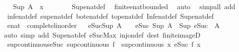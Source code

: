 \begin{isabellebody}
\ \isamarkupfalse%
\ {\isachardoublequoteopen}Sup\ A\ {\isasymle}\ x{\isachardoublequoteclose}\isanewline
\ \ \ \ \ \ \isamarkupfalse%
\ Sup{\isacharunderscore}enat{\isacharunderscore}def\ \isamarkupfalse%
\ finite{\isacharunderscore}enat{\isacharunderscore}bounded\ \isamarkupfalse%
\ auto\ \isacommand{{\isacharbraceright}}\isamarkupfalse%
\isanewline
{}\isamarkupfalse%
\ {\isacharparenleft}simp{\isacharunderscore}all\ add{\isacharcolon}\isanewline
\ inf{\isacharunderscore}enat{\isacharunderscore}def\ sup{\isacharunderscore}enat{\isacharunderscore}def\ bot{\isacharunderscore}enat{\isacharunderscore}def\ top{\isacharunderscore}enat{\isacharunderscore}def\ Inf{\isacharunderscore}enat{\isacharunderscore}def\ Sup{\isacharunderscore}enat{\isacharunderscore}def{\isacharparenright}%
\endisatagproof
{\isafoldproof}%
%
\isadelimproof
\isanewline
%
\endisadelimproof
{}\isamarkupfalse%
\isanewline
\isanewline
{}\isamarkupfalse%
\ enat\ {\isacharcolon}{\isacharcolon}\ complete{\isacharunderscore}linorder%
\isadelimproof
\ %
\endisadelimproof
%
\isatagproof
\isacommand{{\isachardot}{\isachardot}}\isamarkupfalse%
%
\endisatagproof
{\isafoldproof}%
%
\isadelimproof
%
\endisadelimproof
\isanewline
\isanewline
{}\isamarkupfalse%
\ eSuc{\isacharunderscore}Sup{\isacharcolon}\ {\isachardoublequoteopen}A\ {\isasymnoteq}\ {\isacharbraceleft}{\isacharbraceright}\ {\isasymLongrightarrow}\ eSuc\ {\isacharparenleft}Sup\ A{\isacharparenright}\ {\isacharequal}\ Sup\ {\isacharparenleft}eSuc\ {\isacharbackquote}\ A{\isacharparenright}{\isachardoublequoteclose}\isanewline
%
\isadelimproof
\ \ %
\endisadelimproof
%
\isatagproof
{}\isamarkupfalse%
{\isacharparenleft}auto\ simp\ add{\isacharcolon}\ Sup{\isacharunderscore}enat{\isacharunderscore}def\ eSuc{\isacharunderscore}Max\ inj{\isacharunderscore}on{\isacharunderscore}def\ dest{\isacharcolon}\ finite{\isacharunderscore}imageD{\isacharparenright}%
\endisatagproof
{\isafoldproof}%
%
\isadelimproof
\isanewline
%
\endisadelimproof
\isanewline
{}\isamarkupfalse%
\ sup{\isacharunderscore}continuous{\isacharunderscore}eSuc{\isacharcolon}\ {\isachardoublequoteopen}sup{\isacharunderscore}continuous\ f\ {\isasymLongrightarrow}\ sup{\isacharunderscore}continuous\ {\isacharparenleft}{\isasymlambda}x{\isachardot}\ eSuc\ {\isacharparenleft}f\ x{\isacharparenright}{\isacharparenright}{\isachardoublequoteclose}\isanewline
%
\isadelimproof
\ \ %
\endisadelimproof
%
\isatagproof
{}\isamarkupfalse%

\end{isabellebody}
